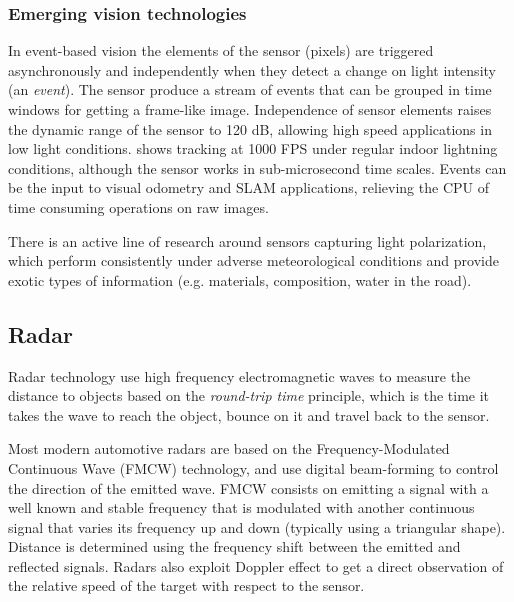 \documentclass[journal]{IEEEtran}
\begin{document}
\subsubsection{Emerging vision technologies}

In event-based vision the elements of the sensor (pixels) are triggered 
asynchronously and independently when they detect a change on light intensity 
(an \emph{event}).
The sensor produce a stream of events that can be grouped in time windows for
getting a frame-like image. 
Independence of sensor elements raises the dynamic range of the sensor to 
120 dB, allowing high speed applications in low light conditions. 
\cite{Mueggler2014} shows tracking at 1000 FPS under regular indoor lightning 
conditions, although the sensor works in sub-microsecond time scales.
Events can be the input to visual odometry \cite{Censi2014} and SLAM
\cite{Vidal2017} applications, relieving the CPU of time consuming operations
on raw images. 

There is an active line of research \cite{Garcia2018} around sensors 
capturing light polarization, which perform consistently under adverse
meteorological conditions and provide exotic types of information (e.g.
materials, composition, water in the road).


\subsection{Radar}

Radar technology use high frequency electromagnetic waves to measure the
distance to objects based on the \emph{round-trip time} principle, which is the
time it takes the wave to reach the object, bounce on it and travel back to the
sensor. 

Most modern automotive radars are based on the Frequency-Modulated Continuous
Wave (FMCW) technology, and use digital beam-forming \cite{Hasch2015} to control
the direction of the emitted wave. 
FMCW consists on emitting a signal with a well known and stable frequency that
is modulated with another continuous signal that varies its frequency up and
down (typically using a triangular shape). Distance is
determined using the frequency shift between the emitted and reflected signals. 
Radars also exploit Doppler effect to get a direct observation of the relative
speed of the target with respect to the sensor. 

\end{document}
